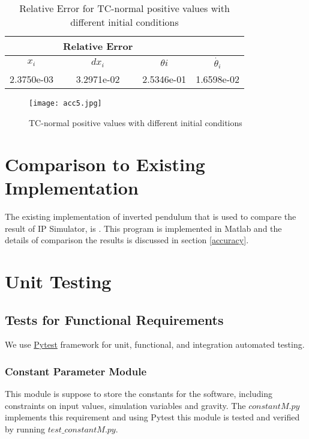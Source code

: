 \documentclass[12pt, titlepage]{article}
\begin{document}
\begin{table}[ht]
\caption{Relative Error for TC-normal positive values with different initial conditions} \label{diffInires}
\vspace*{2mm}
\centering
 \begin{tabular}{|c c c c|} 
 \hline
&\textbf{Relative Error}&&\\ \hline
$x_i$&$dx_i$&$\theta{i}$&$\dot{\theta_{i}}$ \\ \hline
2.3750e-03 & 3.2971e-02 & 2.5346e-01 & 1.6598e-02
\\ \hline
\end{tabular}
\end{table}	

\begin{figure}[H]
\begin{center}
\texttt{[image: acc5.jpg]}
 \caption{TC-normal positive values with different initial conditions}
 \label{diffIni_fig}
 \end{center}
 \end{figure}


\section{Comparison to Existing Implementation}	
The existing implementation of inverted pendulum that is used to compare the result of IP Simulator, is \cite{al-khazraji_2022}. This program is implemented in Matlab and the details of comparison the results is discussed in section \ref{accuracy}.\\

\section{Unit Testing}\label{unittest}
\subsection{Tests for Functional Requirements}
We use \href{https://docs.pytest.org/en/7.2.x/}{Pytest} framework for unit, functional, and integration automated testing.\\

\subsubsection{Constant Parameter Module}\label{cons}
This module is suppose to store the constants for the software, including constraints on input values, simulation variables and gravity. The \href{https://github.com/MinMah23/CAS741-Project/blob/main/src/constantM.py}{$constantM.py$} implements this requirement and using Pytest this module is tested and verified by running \href{https://github.com/MinMah23/CAS741-Project/blob/main/test/test_constantM.py}{$test\_constantM.py$}.\\
\end{document}
